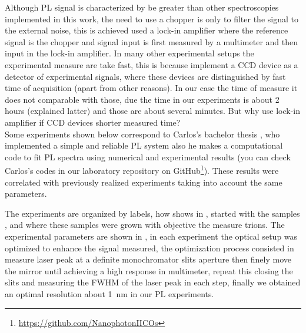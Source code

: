  Although PL signal is characterized by be greater than other spectroscopies implemented in this work, the need to use a chopper is only to filter the signal to the external noise, this is achieved used a lock-in amplifier where the reference signal is the chopper and signal input is first measured by a multimeter and then input in the lock-in amplifier. In many other experimental setups the experimental measure are take  fast,  this is because  implement a CCD device as a detector of experimental signals, where  these devices are distinguished by fast time of acquisition (apart from other reasons). In our case the time of measure it does not comparable with those, due the time in our experiments is about 2 hours (explained latter) and those are about several minutes. But why use lock-in amplifier if CCD devices shorter measured time?\\
Some experiments shown below correspond to Carlos's bachelor thesis \cite{carlos2020thesis}, who implemented a simple and reliable PL system also he makes a computational code to fit PL spectra using numerical and experimental results (you can check Carlos's codes in our laboratory  repository on GitHub\footnote{\url{https://github.com/NanophotonIICOs}}). These results were correlated with previously   realized  experiments taking into account the same parameters. 

The experiments are organized by labels, how shows in , started with the samples ,  and  where these samples were grown with objective the measure trions. The experimental parameters are shown in , in each experiment the optical setup was optimized to enhance the signal measured, the optimization process consisted in measure laser peak at a definite monochromator slits aperture then finely move the mirror until achieving a high response in multimeter, repeat this closing the slits and measuring the FWHM of the laser peak in each step, finally we obtained an optimal resolution about 1 nm in our \gls{PL} experiments. 

